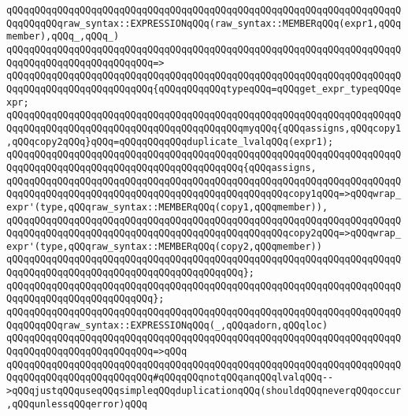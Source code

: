 \newline
\verb|qQQqqQQqqQQqqQQqqQQqqQQqqQQqqQQqqQQqqQQqqQQqqQQqqQQqqQQqqQQqqQQqqQQqqQQqqQQqqQQqraw_syntax::EXPRESSIONqQQq(raw_syntax::MEMBERqQQq(expr1,qQQqmember),qQQq_,qQQq_)|\newline
\verb|qQQqqQQqqQQqqQQqqQQqqQQqqQQqqQQqqQQqqQQqqQQqqQQqqQQqqQQqqQQqqQQqqQQqqQQqqQQqqQQqqQQqqQQqqQQqqQQq=>|\newline
\verb|qQQqqQQqqQQqqQQqqQQqqQQqqQQqqQQqqQQqqQQqqQQqqQQqqQQqqQQqqQQqqQQqqQQqqQQqqQQqqQQqqQQqqQQqqQQqqQQq{qQQqqQQqqQQqtypeqQQq=qQQqget_expr_typeqQQqexpr;|\newline
\newline
\verb|qQQqqQQqqQQqqQQqqQQqqQQqqQQqqQQqqQQqqQQqqQQqqQQqqQQqqQQqqQQqqQQqqQQqqQQqqQQqqQQqqQQqqQQqqQQqqQQqqQQqqQQqqQQqqQQqmyqQQq{qQQqassigns,qQQqcopy1,qQQqcopy2qQQq}qQQq=qQQqqQQqqQQqduplicate_lvalqQQq(expr1);|\newline
\newline
\verb|qQQqqQQqqQQqqQQqqQQqqQQqqQQqqQQqqQQqqQQqqQQqqQQqqQQqqQQqqQQqqQQqqQQqqQQqqQQqqQQqqQQqqQQqqQQqqQQqqQQqqQQqqQQqqQQq{qQQqassigns,|\newline
\verb|qQQqqQQqqQQqqQQqqQQqqQQqqQQqqQQqqQQqqQQqqQQqqQQqqQQqqQQqqQQqqQQqqQQqqQQqqQQqqQQqqQQqqQQqqQQqqQQqqQQqqQQqqQQqqQQqqQQqqQQqcopy1qQQq=>qQQqwrap_expr'(type,qQQqraw_syntax::MEMBERqQQq(copy1,qQQqmember)),|\newline
\verb|qQQqqQQqqQQqqQQqqQQqqQQqqQQqqQQqqQQqqQQqqQQqqQQqqQQqqQQqqQQqqQQqqQQqqQQqqQQqqQQqqQQqqQQqqQQqqQQqqQQqqQQqqQQqqQQqqQQqqQQqcopy2qQQq=>qQQqwrap_expr'(type,qQQqraw_syntax::MEMBERqQQq(copy2,qQQqmember))|\newline
\verb|qQQqqQQqqQQqqQQqqQQqqQQqqQQqqQQqqQQqqQQqqQQqqQQqqQQqqQQqqQQqqQQqqQQqqQQqqQQqqQQqqQQqqQQqqQQqqQQqqQQqqQQqqQQqqQQq};|\newline
\verb|qQQqqQQqqQQqqQQqqQQqqQQqqQQqqQQqqQQqqQQqqQQqqQQqqQQqqQQqqQQqqQQqqQQqqQQqqQQqqQQqqQQqqQQqqQQqqQQq};|\newline
\newline
\verb|qQQqqQQqqQQqqQQqqQQqqQQqqQQqqQQqqQQqqQQqqQQqqQQqqQQqqQQqqQQqqQQqqQQqqQQqqQQqqQQqraw_syntax::EXPRESSIONqQQq(_,qQQqadorn,qQQqloc)|\newline
\verb|qQQqqQQqqQQqqQQqqQQqqQQqqQQqqQQqqQQqqQQqqQQqqQQqqQQqqQQqqQQqqQQqqQQqqQQqqQQqqQQqqQQqqQQqqQQqqQQq=>qQQq|\newline
\verb|qQQqqQQqqQQqqQQqqQQqqQQqqQQqqQQqqQQqqQQqqQQqqQQqqQQqqQQqqQQqqQQqqQQqqQQqqQQqqQQqqQQqqQQqqQQqqQQq#qQQqqQQqnotqQQqanqQQqlvalqQQq-->qQQqjustqQQquseqQQqsimpleqQQqduplicationqQQq(shouldqQQqneverqQQqoccur,qQQqunlessqQQqerror)qQQq|\newline
